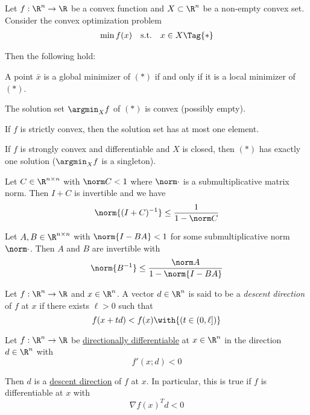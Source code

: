 \label{f546fc9}

Let $f:\R^n\to\R$ be a convex function and $X\subset\R^n$ be a non-empty convex
set. Consider the convex optimization problem
\begin{equation*}
  \begin{array}{l l l}
    \min f(x) & \text{s.t.} & x\in X\Tag{*}
  \end{array}
\end{equation*}

Then the following hold:
\begin{enumerata}
  \item A point $\bar x$ is a global minimizer of $(*)$ if and only if it is a
        local minimizer of $(*)$.
  \item The solution set $\argmin_Xf$ of $(*)$ is convex (possibly empty).
  \item If $f$ is strictly convex, then the solution set has at most one
        element.
  \item If $f$ is strongly convex and differentiable and $X$ is closed, then
        $(*)$ has exactly one solution ($\argmin_Xf$ is a singleton).
\end{enumerata}

\label{c733e75}

Let $C\in\R^{n\times n}$ with $\norm C<1$ where $\norm\cdot$ is a
submultiplicative matrix norm. Then $I+C$ is invertible and we have
$$
  \norm{(I+C)^{-1}}\leq\frac1{1-\norm C}
$$

\Corollary{}\label{ae04fae}

Let $A,B\in\R^{n\times n}$ with $\norm{I-BA}<1$ for some submultiplicative norm
$\norm\cdot$. Then $A$ and $B$ are invertible with
$$
  \norm{B^{-1}}\leq\frac{\norm A}{1-\norm{I-BA}}
$$

\label{ac99a6d}

Let $f:\R^n\to\R$ and $x\in\R^n$. A vector $d\in\R^n$ is said to be a
\textit{descent direction} of $f$ at $x$ if there exists $\ell>0$ such that
$$
  f(x+td)<f(x)\with{(t\in(0,\ell])}
$$

\label{f81d53c}

Let $f:\R^n\to\R$ be \href{b7d1188}{directionally differentiable} at $x\in\R^n$
in the direction $d\in\R^n$ with
$$
  f'(x;d)<0
$$

Then $d$ is a \href{ac99a6d}{descent direction} of $f$ at $x$. In particular,
this is true if $f$ is differentiable at $x$ with
$$
  \nabla f(x)^Td<0
$$

